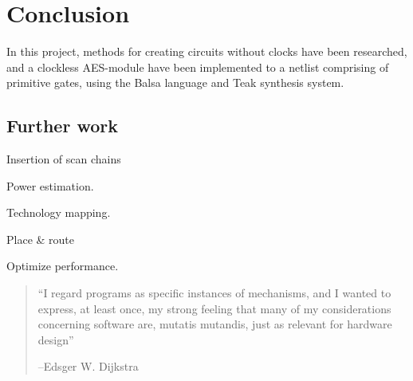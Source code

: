\section{Conclusion}

In this project, methods for creating circuits without clocks have
been researched, and a clockless AES-module have been implemented to a
netlist comprising of primitive gates, using the Balsa language and
Teak synthesis system.

\subsection{Further work}

Insertion of scan chains

Power estimation.

Technology mapping.

Place \& route

Optimize performance.

\begin{quotation}
  ``I regard programs as specific instances of mechanisms, and I wanted
  to express, at least once, my strong feeling that many of my
  considerations concerning software are, mutatis mutandis, just as
  relevant for hardware design''

  --Edsger W. Dijkstra
\end{quotation}


